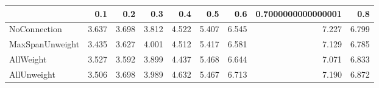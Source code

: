 \begin{tabular}{lrrrrrrrr}
\toprule
{} &   0.1 &   0.2 &   0.3 &   0.4 &   0.5 &   0.6 & 0.7000000000000001 &   0.8 \\
\midrule
NoConnection    & 3.637 & 3.698 & 3.812 & 4.522 & 5.407 & 6.545 &              7.227 & 6.799 \\
MaxSpanUnweight & 3.435 & 3.627 & 4.001 & 4.512 & 5.417 & 6.581 &              7.129 & 6.785 \\
AllWeight       & 3.527 & 3.592 & 3.899 & 4.437 & 5.468 & 6.644 &              7.071 & 6.833 \\
AllUnweight     & 3.506 & 3.698 & 3.989 & 4.632 & 5.467 & 6.713 &              7.190 & 6.872 \\
\bottomrule
\end{tabular}
